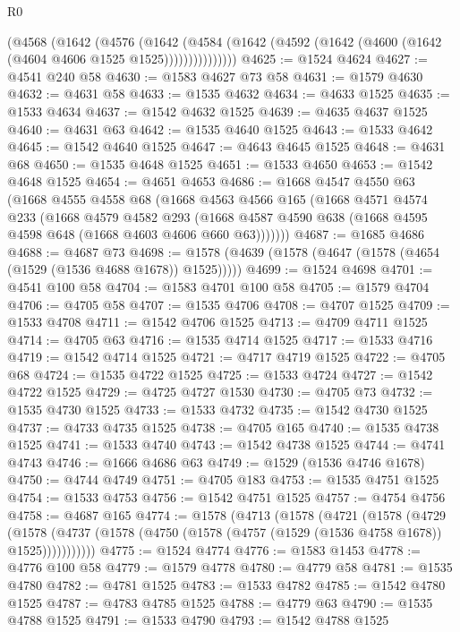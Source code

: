 \begin{lexlean}{R0}
\begin{coremodule}
            (@4568
              (@1642
                (@4576
                  (@1642
                    (@4584
                      (@1642 (@4592 (@1642 (@4600 (@1642 (@4604 @4606 @1525 @1525)))))))))))))))
@4625 := @1524 @4624
@4627 := @4541 @240 @58
@4630 := @1583 @4627 @73 @58
@4631 := @1579 @4630
@4632 := @4631 @58
@4633 := @1535 @4632
@4634 := @4633 @1525
@4635 := @1533 @4634
@4637 := @1542 @4632 @1525
@4639 := @4635 @4637 @1525
@4640 := @4631 @63
@4642 := @1535 @4640 @1525
@4643 := @1533 @4642
@4645 := @1542 @4640 @1525
@4647 := @4643 @4645 @1525
@4648 := @4631 @68
@4650 := @1535 @4648 @1525
@4651 := @1533 @4650
@4653 := @1542 @4648 @1525
@4654 := @4651 @4653
@4686 := @1668
    @4547
    @4550
    @63
    (@1668
      @4555
      @4558
      @68
      (@1668
        @4563
        @4566
        @165
        (@1668
          @4571
          @4574
          @233
          (@1668
            @4579
            @4582
            @293
            (@1668 @4587 @4590 @638 (@1668 @4595 @4598 @648 (@1668 @4603 @4606 @660 @63)))))))
@4687 := @1685 @4686
@4688 := @4687 @73
@4698 := @1578 (@4639 (@1578 (@4647 (@1578 (@4654 (@1529 (@1536 @4688 @1678)) @1525)))))
@4699 := @1524 @4698
@4701 := @4541 @100 @58
@4704 := @1583 @4701 @100 @58
@4705 := @1579 @4704
@4706 := @4705 @58
@4707 := @1535 @4706
@4708 := @4707 @1525
@4709 := @1533 @4708
@4711 := @1542 @4706 @1525
@4713 := @4709 @4711 @1525
@4714 := @4705 @63
@4716 := @1535 @4714 @1525
@4717 := @1533 @4716
@4719 := @1542 @4714 @1525
@4721 := @4717 @4719 @1525
@4722 := @4705 @68
@4724 := @1535 @4722 @1525
@4725 := @1533 @4724
@4727 := @1542 @4722 @1525
@4729 := @4725 @4727 @1530
@4730 := @4705 @73
@4732 := @1535 @4730 @1525
@4733 := @1533 @4732
@4735 := @1542 @4730 @1525
@4737 := @4733 @4735 @1525
@4738 := @4705 @165
@4740 := @1535 @4738 @1525
@4741 := @1533 @4740
@4743 := @1542 @4738 @1525
@4744 := @4741 @4743
@4746 := @1666 @4686 @63
@4749 := @1529 (@1536 @4746 @1678)
@4750 := @4744 @4749
@4751 := @4705 @183
@4753 := @1535 @4751 @1525
@4754 := @1533 @4753
@4756 := @1542 @4751 @1525
@4757 := @4754 @4756
@4758 := @4687 @165
@4774 := @1578
    (@4713
      (@1578
        (@4721
          (@1578
            (@4729
              (@1578 (@4737 (@1578 (@4750 (@1578 (@4757 (@1529 (@1536 @4758 @1678)) @1525)))))))))))
@4775 := @1524 @4774
@4776 := @1583 @1453
@4778 := @4776 @100 @58
@4779 := @1579 @4778
@4780 := @4779 @58
@4781 := @1535 @4780
@4782 := @4781 @1525
@4783 := @1533 @4782
@4785 := @1542 @4780 @1525
@4787 := @4783 @4785 @1525
@4788 := @4779 @63
@4790 := @1535 @4788 @1525
@4791 := @1533 @4790
@4793 := @1542 @4788 @1525

\end{coremodule}
\end{lexlean}
